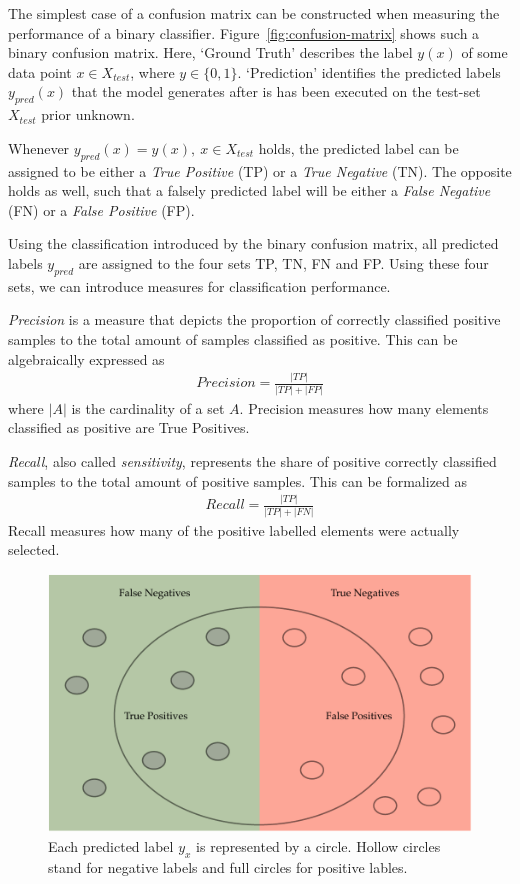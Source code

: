 The simplest case of a confusion matrix can be constructed when measuring the performance of a binary classifier.
Figure~\ref{fig:confusion-matrix} shows such a binary confusion matrix.
Here, `Ground Truth' describes the label \(y(x)\) of some data point \(x \in X_{test}\), where \(y \in \{0, 1\}\).
`Prediction' identifies the predicted labels \(y_{pred}(x)\) that the model generates after is has been executed on the test-set \(X_{test}\) prior unknown.

Whenever \(y_{pred}(x) = y(x),~x \in X_{test}\) holds, the predicted label can be assigned to be either a \emph{True Positive} (TP) or a \emph{True Negative} (TN).
The opposite holds as well, such that a falsely predicted label will be either a \emph{False Negative} (FN) or a \emph{False Positive} (FP).

Using the classification introduced by the binary confusion matrix, all predicted labels \(y_{pred}\) are assigned to the four sets TP, TN, FN and FP.
Using these four sets, we can introduce measures for classification performance.

\emph{Precision} is a measure that depicts the proportion of correctly classified positive samples to the total amount of samples classified as positive.\cite[p.4]{THA18} This can be algebraically expressed as
\begin{align}\label{eq:precision}
    Precision = \frac{|TP|}{|TP| + |FP|}
\end{align}
where \(|A|\) is the cardinality of a set \(A\). Precision measures how many elements classified as positive are True Positives.

\emph{Recall}, also called \emph{sensitivity}, represents the
share of positive correctly classified samples to the total amount of positive samples.\cite[p.3]{THA18} This can be formalized as
\begin{align}\label{eq:recall}
    Recall = \frac{|TP|}{|TP| + |FN|}
\end{align}
Recall measures how many of the positive labelled elements were actually selected.

\begin{figure}[ht]
    \centering
    \includegraphics[width=\textwidth]{images/precision-and-recall}
    \caption{Each predicted label \(y_{x}\) is represented by a circle. Hollow circles stand for negative labels and full circles for positive lables.  }
    \label{fig:precision-and-recall}
\end{figure}

